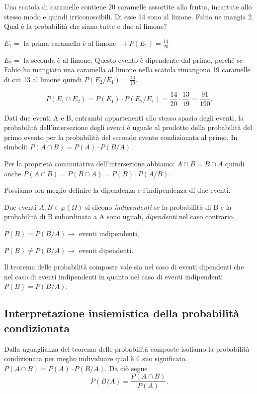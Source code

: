 \begin{esempio}
Una scatola di caramelle contiene 20 caramelle assortite alla frutta, 
incartate 
allo stesso modo e quindi irriconoscibili. Di esse 14 sono al limone. Fabio 
ne 
mangia 2. Qual è la probabilità che siano tutte e due al limone?
\begin{itemize*}
\item $E_1=$ la prima caramella è al limone $\to P(E_1)=\frac{14}{20}$
\item $E_2=$ la seconda è al limone. Questo evento è dipendente dal primo, 
perché se Fabio ha mangiato una caramella al limone nella scatola rimangono 
19 
caramelle di cui 13 al limone quindi $P(E_2/E_1)=\frac{13}{19}$.
\end{itemize*}
\[P(E_1\cap E_2)=P(E_1)\cdot P(E_2/E_1)=\frac{14}{20}\cdot 
\frac{13}{19}=\frac{91}{190}.\]
\end{esempio}

\begin{teorema}
Dati due eventi A e B, entrambi appartenenti allo stesso spazio degli 
eventi, 
la 
probabilità dell'intersezione degli eventi è uguale al prodotto della 
probabilità del primo evento per la probabilità del secondo evento 
condizionata 
al primo. In simboli: $P(A\cap B)=P(A)\cdot P(B/A)$.
\end{teorema}

Per la proprietà commutativa dell'intersezione abbiamo: $A\cap B=B\cap A$ 
quindi 
anche $P(A\cap B)=P(B\cap A)=P(B)\cdot P(A/B)$.

Possiamo ora meglio definire la dipendenza e l'indipendenza di due eventi.

\begin{definizione}
Due eventi $A,B\in \wp (\Omega )$ si dicono \emph{indipendenti} se la 
probabilità di B e la probabilità di B subordinata a A sono uguali, 
\emph{dipendenti} nel caso contrario.

$P(B)=P(B/A)\to$ eventi indipendenti;

 ${P}(B)\neq P(B/A)\to$ eventi dipendenti.
\end{definizione}

\osservazione Il teorema delle probabilità composte vale sia nel caso di 
eventi 
dipendenti che nel caso di eventi indipendenti in quanto nel caso di eventi 
indipendenti $P(B)=P(B/A)$.

\subsection{Interpretazione insiemistica della probabilità condizionata}
Dalla uguaglianza del teorema delle probabilità composte isoliamo la 
probabilità 
condizionata per meglio individuare qual è il suo significato. $P(A\cap 
B)=P(A)\cdot P(B/A)$. Da ciò segue 
\[P(B/A)=\frac{P(A\cap B)}{P(A)}.\]


